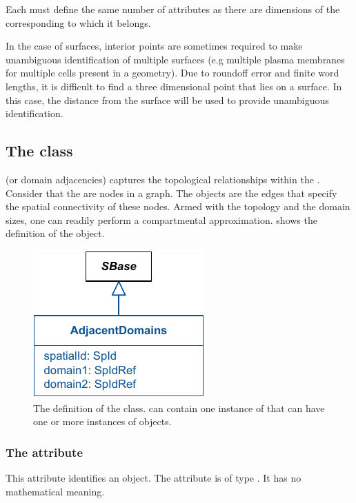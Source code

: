Each \InteriorPoint must define the same number of attributes as there are dimensions of the corresponding \Geometry to which it belongs.

In the case of surfaces, interior points are sometimes required to make unambiguous identification of multiple surfaces (e.g multiple plasma membranes for multiple cells present in a geometry).  Due to roundoff error and finite word lengths, it is difficult to find a three dimensional point that lies on a surface.  In this case, the distance from the surface will be used to provide unambiguous identification.


\subsection{The  class}
\label{AdjacentDomains-class}
\AdjacentDomains (or domain adjacencies) captures the topological relationships within the \Geometry.  Consider that the \Domains are nodes in a graph. The \AdjacentDomains objects are the edges that specify the spatial connectivity of these nodes.  Armed with the topology and the domain sizes, one can readily perform a compartmental approximation.   shows the definition of the \AdjacentDomains object.

\begin{figure}[ht]
  \includegraphics{figs/AdjacentDomains-uml}
  \caption{The definition of the \AdjacentDomains class. \Geometry can contain one instance of \ListOfAdjacentDomains that can have one or more instances of \AdjacentDomains objects.}
  \label{AdjacentDomains-uml}
\end{figure}

\subsubsection{The  attribute}
This attribute identifies an \AdjacentDomains object. The attribute is of type .  It has no mathematical meaning.

